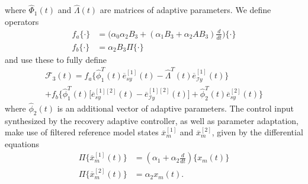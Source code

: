 where $\hat{\Phi}_1(t)$ and $\hat{\Lambda}(t)$ are matrices of adaptive parameters. We define operators
\begin{equation}
\begin{aligned}
	f_a \{ \cdot \} &= \big(\alpha_0 \alpha_2 B_3 + (\alpha_1 B_3 + \alpha_2 A B_3)\frac{d}{dt} \big) \{ \cdot \} \\
	f_b \{ \cdot \} &= \alpha_2 B_3 \Pi \{ \cdot \}
\end{aligned}
\end{equation}
and use these to fully define
\begin{multline}
	\mathcal{F}_3(t) = f_a \big \{ \hat{\phi}_1^T(t) \overline{e}_{sy}^{[1]}(t) - \hat{\Lambda}^T(t) \overline{e}_{\mathcal{I}y}^{[1]} (t) \big \} \\
	+ f_b \big \{ \hat{\phi}_1^T(t) \big[\overline{e}_{sy}^{[1][2]}(t) -  \overline{e}_{\mathcal{I}y}^{[1][2]} (t) \big ] + \hat{\phi}_2^T (t) \overline{e}_{sy}^{[2]}(t) \big \} \label{eq:F3}
\end{multline}
where $\hat{\phi}_2(t)$ is an additional vector of adaptive parameters. The control input synthesized by the recovery adaptive controller, as well as parameter adaptation, make use of filtered reference model states $\overline{x}_m^{[1]}$ and $\overline{x}_m^{[2]}$, given by the differential equations
\begin{equation}
\begin{aligned}
	\Pi \big \{  \overline{x}_{m}^{[1]} (t) \big \} &= (\alpha_1 + \alpha_2 \frac{d}{dt}) \big \{ x_m (t) \big \} \\
	\Pi \big \{  \overline{x}_{m}^{[2]}(t) \big \} &= \alpha_2 x_m (t).
\end{aligned}	
\end{equation}


